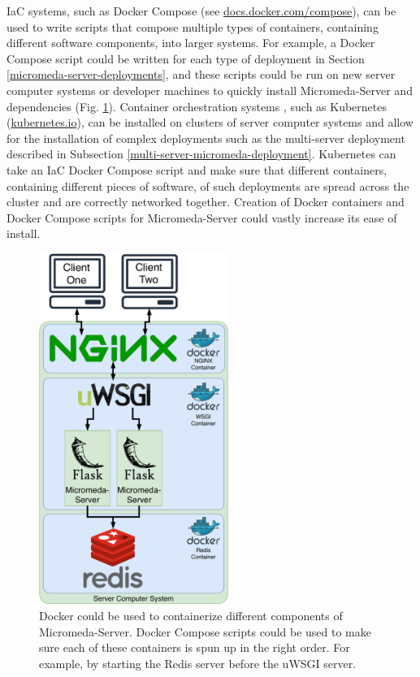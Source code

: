 IaC systems, such as Docker Compose (see \href{docs.docker.com/compose}{docs.docker.com/compose}), can be used to write scripts that compose multiple types of containers, containing different software components, into larger systems. For example, a Docker Compose script could be written for each type of deployment in Section \ref{micromeda-server-deployments}, and these scripts could be run on new server computer systems or developer machines to quickly install Micromeda-Server and dependencies (Fig. \ref{fig:micromeda-docker}). Container orchestration systems \cite{tosatto2015container}, such as Kubernetes (\href{kubernetes.io}{kubernetes.io}), can be installed on clusters of server computer systems and allow for the installation of complex deployments such as the multi-server deployment described in Subsection \ref{multi-server-micromeda-deployment}. Kubernetes can take an IaC Docker Compose script and make sure that different containers, containing different pieces of software, of such deployments are spread across the cluster and are correctly networked together. Creation of Docker containers and Docker Compose scripts for Micromeda-Server could vastly increase its ease of install.

\begin{figure}[!ht]
  \centering
	\includegraphics[width=0.55\textwidth]{media/micromeda-server-docker.pdf}
	 \caption{Docker could be used to containerize different components of Micromeda-Server. Docker Compose scripts could be used to make sure each of these containers is spun up in the right order. For example, by starting the Redis server before the uWSGI server.}
	 \label{fig:micromeda-docker}
\end{figure}

